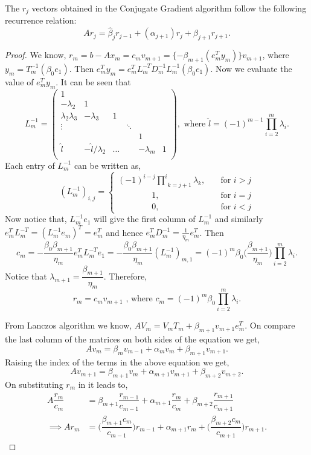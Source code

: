 \documentclass[10pt,a4paper]{article}
\begin{document}
\begin{prop}
The $r_j$ vectors obtained in the Conjugate Gradient algorithm follow the following recurrence relation:
$$Ar_j=\hat{\beta}_jr_{j-1}+(\alpha_{j+1})r_j+\hat{\beta}_{j+1}r_{j+1}.$$ 
\end{prop}

\begin{proof}
We know, $r_m=b-Ax_m=c_mv_{m+1}=\{-\beta_{m+1}(e^T_my_m)\}v_{m+1}$, where  $y_m=T^{-1}_m(\beta_0e_1).$ Then $e^T_my_m=e^T_mL^{-T}_mD^{-1}_mL^{-1}_m(\beta_0e_1)$. Now we evaluate the value of $e^T_my_m$. It can be seen that 
$$L^{-1}_m =
\left( \begin{array}{cccccc}
1 &  &  &  &  & \\
-\lambda_2 & 1 &  &  &  & \\
\lambda_2\lambda_3 & -\lambda_3 & 1 &  &  & \\
\vdots &  &  & \ddots &  & \\
 &  &  &  & 1 &  \\
\hat{l} & -\hat{l}/\lambda_2 & \hdots &  & -\lambda_m & 1 \\
\end{array} \right),\text{ where }\hat{l}=(-1)^{m-1}\prod^m_{i=2}\lambda_i.$$
Each entry of $L^{-1}_m$ can be written as,
\[   
(L^{-1}_m)_{i,j} = 
     \begin{cases}	
      (-1)^{i-j}\underset{k = j+1}{\overset{i}{\prod}}\lambda_k, &\quad\text{for }i>j\\
      \qquad \qquad 1, &\quad\text{for }i=j\\
      \qquad \qquad 0, &\quad\text{for }i<j
     \end{cases}
\]
Now notice that, $L^{-1}_me_1$ will give the first column of $L^{-1}_m$ and similarly $e^T_mL^{-T}_m = (L^{-1}_me_m)^T = e^T_m$ and hence $e^T_mD^{-1}_m=\frac{1}{\eta_m}e^T_m$. Then $$c_m=-\dfrac{\beta_0\beta_{m+1}}{\eta_m}e^T_mL^{-T}_me_1=-\dfrac{\beta_0\beta_{m+1}}{\eta_m}(L^{-1}_m)_{m,1}=(-1)^{m}\beta_0\bigg(\dfrac{\beta_{m+1}}{\eta_m}\bigg)\underset{i=2}{\overset{m}{\prod}}\lambda_i.$$
Notice that $\lambda_{m+1}=\dfrac{\beta_{m+1}}{\eta_m}$. Therefore, $$r_m = c_mv_{m+1}\text{ , where }c_m=(-1)^{m}\beta_0\underset{i=2}{\overset{m}{\prod}}\lambda_i.$$

From Lanczos algorithm we know, $AV_m=V_mT_m+\beta_{m+1}v_{m+1}e^T_m.$ On compare the last column of the matrices on both sides of the equation we get, 
$$Av_m=\beta_mv_{m-1}+\alpha_mv_m+\beta_{m+1}v_{m+1}.$$
Raising the index of the terms in the above equation we get,
$$Av_{m+1}=\beta_{m+1}v_{m}+\alpha_{m+1}v_{m+1}+\beta_{m+2}v_{m+2}.$$
On substituting $r_m$ in it leads to,
\begin{align*}
A\dfrac{r_m}{c_m}&=\beta_{m+1}\dfrac{r_{m-1}}{c_{m-1}}+\alpha_{m+1}\dfrac{r_{m}}{c_{m}}+\beta_{m+2}\dfrac{r_{m+1}}{c_{m+1}} \\
\implies Ar_m&=\bigg(\dfrac{\beta_{m+1}c_m}{c_{m-1}}\bigg)r_{m-1}+\alpha_{m+1}r_{m}+\bigg(\dfrac{\beta_{m+2}c_m}{c_{m+1}}\bigg)r_{m+1}.
\end{align*}
\end{proof}
\end{document}
